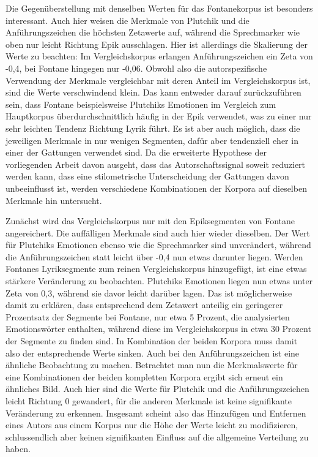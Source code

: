 \documentclass[a4paper,10p]{article}
\begin{document}
Die Gegenüberstellung mit denselben Werten für das Fontanekorpus ist besonders interessant. Auch hier weisen die Merkmale von Plutchik und die Anführungszeichen die höchsten Zetawerte auf, während die Sprechmarker wie oben nur leicht Richtung Epik ausschlagen. Hier ist allerdings die Skalierung der Werte zu beachten: Im Vergleichskorpus erlangen Anführungszeichen ein Zeta von -0,4, bei Fontane hingegen nur -0,06. Obwohl also die autorspezifische Verwendung der Merkmale vergleichbar mit deren Anteil im Vergleichskorpus ist, sind die Werte verschwindend klein. Das kann entweder darauf zurückzuführen sein, dass Fontane beispielsweise Plutchiks Emotionen im Vergleich zum Hauptkorpus überdurchschnittlich häufig in der Epik verwendet, was zu einer nur sehr leichten Tendenz Richtung Lyrik führt. Es ist aber auch möglich, dass die jeweiligen Merkmale in nur wenigen Segmenten, dafür aber tendenziell eher in einer der Gattungen verwendet sind. Da die erweiterte Hypothese der vorliegenden Arbeit davon ausgeht, dass das Autorschaftssignal soweit reduziert werden kann, dass eine stilometrische Unterscheidung der Gattungen davon unbeeinflusst ist, werden verschiedene Kombinationen der Korpora auf dieselben Merkmale hin untersucht. \par 

Zunächst wird das Vergleichskorpus nur mit den Epiksegmenten von Fontane angereichert. Die auffälligen Merkmale sind auch hier wieder dieselben. Der Wert für Plutchiks Emotionen ebenso wie die Sprechmarker sind unverändert, während die Anführungszeichen statt leicht über -0,4 nun etwas darunter liegen. Werden Fontanes Lyriksegmente zum reinen Vergleichskorpus hinzugefügt, ist eine etwas stärkere Veränderung zu beobachten. Plutchiks Emotionen liegen nun etwas unter Zeta von 0,3, während sie davor leicht darüber lagen. Das ist möglicherweise damit zu erklären, dass entsprechend dem Zetawert anteilig ein geringerer Prozentsatz der Segmente bei Fontane, nur etwa 5 Prozent, die analysierten Emotionswörter enthalten, während diese im Vergleichskorpus in etwa 30 Prozent der Segmente zu finden sind. In Kombination der beiden Korpora muss damit also der entsprechende Werte sinken. Auch bei den Anführungszeichen ist eine ähnliche Beobachtung zu machen. Betrachtet man nun die Merkmalswerte für eine Kombinationen der beiden kompletten Korpora ergibt sich erneut ein ähnliches Bild. Auch hier sind die Werte für Plutchik und die Anführungszeichen leicht Richtung 0 gewandert, für die anderen Merkmale ist keine signifikante Veränderung zu erkennen. Insgesamt scheint also das Hinzufügen und Entfernen eines Autors aus einem Korpus nur die Höhe der Werte leicht zu modifizieren, schlussendlich aber keinen signifikanten Einfluss auf die allgemeine Verteilung zu haben. \par 
\end{document}
